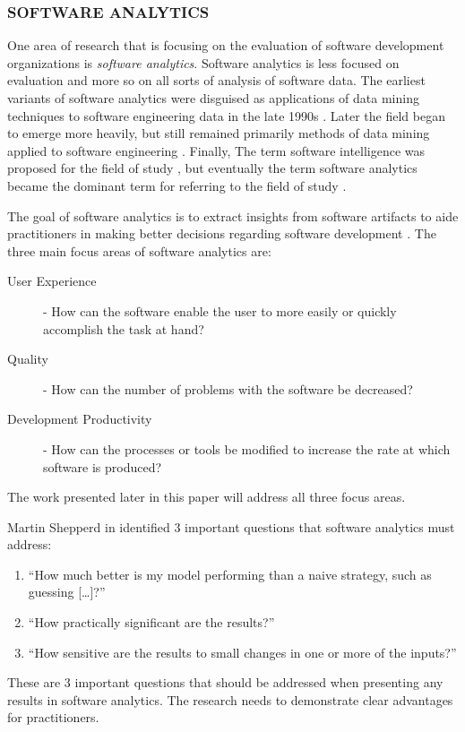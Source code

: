 \documentclass[SDSUThesis.tex]{subfiles}
\begin{document}
\subsubsection{SOFTWARE ANALYTICS}

    One area of research that is focusing on the evaluation 
    of software development organizations
    is \textit{software analytics}. 
    Software analytics is less focused on evaluation
    and more so on all sorts of analysis of software data.
    The earliest variants
    of software analytics were disguised as
    applications of data mining techniques to software 
    engineering data in the 
    late 1990s \cite{Ruhe1997,Ebert1999,Goel1997}.   
    Later the field began to emerge more heavily, but still
    remained primarily methods of data mining applied to 
    software engineering \cite{Kaner2004,Xie2009,Taylor2010,Halkidi2011}. 
    Finally, The term software intelligence was proposed for the field of study
    \cite{Hassan2010}, but eventually
    the term software analytics became the dominant term for referring to the 
    field of study \cite{Buse2010, Zhang2011}.
    
    The goal of software analytics is to extract insights
    from software artifacts to aide practitioners in making 
    better decisions regarding software
    development \cite{Zhang2013}.  The three main focus areas of 
    software analytics are:
    \begin{description}
        \item[User Experience] - How can the software enable the 
            user to more easily or quickly 
            accomplish the task at hand?
        \item[Quality] - How can the number of problems with 
            the software be decreased?
        \item[Development Productivity] - How can the processes
            or tools be modified to increase 
            the rate at which software is produced? 
    \end{description}
    The work presented later in this paper will address all three
    focus areas.  

    Martin Shepperd in \cite{Hassan2013} identified 3 important questions that software
    analytics must address:
    \begin{enumerate}
        \item ``How much better is my model performing than 
            a naive strategy, such as guessing [\ldots]?''
        \item ``How practically significant are the results?''
        \item ``How sensitive are the results to small changes in 
            one or more of the inputs?''
    \end{enumerate}
    These are 3 important questions that should be addressed 
    when presenting any results in software analytics.  The research
    needs to demonstrate clear advantages for practitioners.
\end{document}
